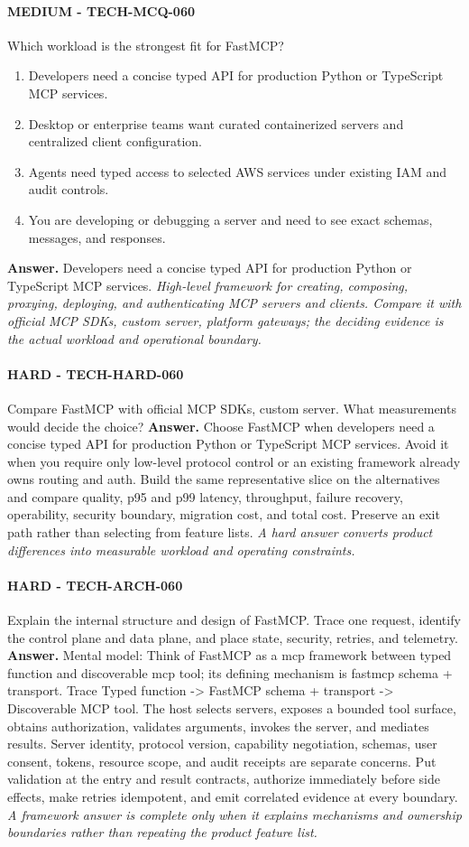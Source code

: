 \paragraph{MEDIUM - TECH-MCQ-060} Which workload is the strongest fit for FastMCP?
\begin{enumerate}[label=\Alph*.]
\item Developers need a concise typed API for production Python or TypeScript MCP services.
\item Desktop or enterprise teams want curated containerized servers and centralized client configuration.
\item Agents need typed access to selected AWS services under existing IAM and audit controls.
\item You are developing or debugging a server and need to see exact schemas, messages, and responses.
\end{enumerate}
\textbf{Answer.} Developers need a concise typed API for production Python or TypeScript MCP services.
\textit{High-level framework for creating, composing, proxying, deploying, and authenticating MCP servers and clients. Compare it with official MCP SDKs, custom server, platform gateways; the deciding evidence is the actual workload and operational boundary.}
\paragraph{HARD - TECH-HARD-060} Compare FastMCP with official MCP SDKs, custom server. What measurements would decide the choice?
\textbf{Answer.} Choose FastMCP when developers need a concise typed API for production Python or TypeScript MCP services. Avoid it when you require only low-level protocol control or an existing framework already owns routing and auth. Build the same representative slice on the alternatives and compare quality, p95 and p99 latency, throughput, failure recovery, operability, security boundary, migration cost, and total cost. Preserve an exit path rather than selecting from feature lists.
\textit{A hard answer converts product differences into measurable workload and operating constraints.}
\paragraph{HARD - TECH-ARCH-060} Explain the internal structure and design of FastMCP. Trace one request, identify the control plane and data plane, and place state, security, retries, and telemetry.
\textbf{Answer.} Mental model: Think of FastMCP as a mcp framework between typed function and discoverable mcp tool; its defining mechanism is fastmcp schema + transport. Trace Typed function -> FastMCP schema + transport -> Discoverable MCP tool. The host selects servers, exposes a bounded tool surface, obtains authorization, validates arguments, invokes the server, and mediates results. Server identity, protocol version, capability negotiation, schemas, user consent, tokens, resource scope, and audit receipts are separate concerns. Put validation at the entry and result contracts, authorize immediately before side effects, make retries idempotent, and emit correlated evidence at every boundary.
\textit{A framework answer is complete only when it explains mechanisms and ownership boundaries rather than repeating the product feature list.}
